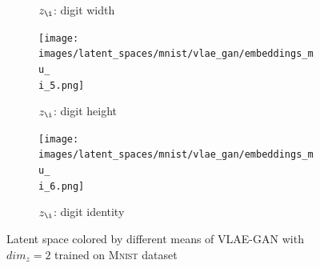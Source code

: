 \begin{landscape}
\begin{figure}[H]
{\begin{adjustbox}{valign=T}
\begin{subfigure}{.19\textwidth}
                \caption{$z_{\i}$: digit width}
                \label{subfig:vlae_mnist_latent_space_z_\i_width}
            \end{subfigure}
        \end{adjustbox}
        \hfill
        \begin{adjustbox}{valign=T}
            \begin{subfigure}{.19\textwidth}
                \texttt{[image: images/latent\_spaces/mnist/vlae\_gan/embeddings\_mu\_\\i\_5.png]}
                \caption{$z_{\i}$: digit height}
                \label{subfig:vlae_mnist_latent_space_z_\i_height}
            \end{subfigure}
        \end{adjustbox}
        \hfill
        \begin{adjustbox}{valign=T}
            \begin{subfigure}{.19\textwidth}
                \texttt{[image: images/latent\_spaces/mnist/vlae\_gan/embeddings\_mu\_\\i\_6.png]}
                \caption{$z_{\i}$: digit identity}
                \label{subfig:vlae_mnist_latent_space_z_\i_identity}
            \end{subfigure}
        \end{adjustbox}}
        \caption[\ac{VLAE}-\ac{GAN} Latent Space - \textsc{Mnist}]{Latent space colored by different means of \ac{VLAE}-\ac{GAN} with $dim_z=2$ trained on \textsc{Mnist} dataset}
        \label{fig:vlae_latent_space_mnist}
    \end{figure}
\end{landscape}

